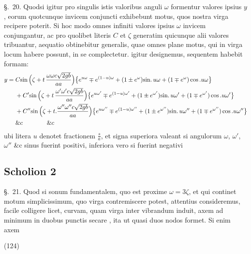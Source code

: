 \documentclass[11pt,a4paper]{article}
\begin{document}
§.~20. Quodsi igitur pro singulis istis valoribus anguli $\omega$ formentur valores
ipsius $y$, eorum quotcunque invicem conjuncti exhibebunt motus, quos nostra virga
recipere poterit. Si hoc modo omnes infiniti valores ipsius $\omega$ invicem
conjungantur, ac pro quolibet literis $C$ et $\zeta$ generatim quicunque alii
valores tribuantur, aequatio obtinebitur generalis, quae omnes plane motus, qui in
virga locum habere possunt, in se complectetur.  igitur designemus, sequentem
habebit formam:
\begin{align}
y ={}& C\text{sin}\,\Bigl(\zeta + t\,\frac{\omega\omega c\sqrt{2gb}}{aa}\Bigr)\bigl\{e^{u\omega} \mp e^{(1-u)\omega} + (1 \pm e^\omega)\text{sin.}\,u\omega + (1 \mp e^\omega)\cos.u\omega\bigr\}\\
&+ C'\text{sin}\,\Bigl(\zeta + t\,\frac{\omega'\omega'c\sqrt{2gb}}{aa}\Bigr)\bigl\{e^{u\omega'} \mp e^{(1-u)\omega'} + (1 \pm e^{\omega'})\text{sin.}\,u\omega' + (1 \mp e^{\omega'})\cos.u\omega'\bigr\}\\
&+ C''\text{sin}\,\Bigl(\zeta + t.\frac{\omega''\omega''c\sqrt{2gb}}{aa}\Bigr)\bigl\{e^{u\omega''} \mp e^{(1-u)\omega''} + (1 \pm e^{\omega''})\text{sin.}\,u\omega'' + (1 \mp e^{\omega''})\cos.u\omega''\bigr\}\\
&\&c \qquad\qquad \&c
\end{align}
ubi litera $u$ denotet fractionem $\frac{s}{a}$, et signa superiora valeant si
angulorum $\omega$, $\omega'$, $\omega''$ \&c sinus fuerint positivi, inferiora vero
si fuerint negativi

\subsection{Scholion 2}

§.~21. Quod si sonum fundamentalem, quo est proxime $\omega = 3\zeta$, et qui
continet motum simplicissimum, quo virga contremiscere potest, attentius
consideremus, facile colligere licet, curvam, quam virga inter vibrandum induit,
axem ad minimum in duobus punctis secare , ita ut quasi duos nodos formet.
Si enim axem

(124)
\end{document}
